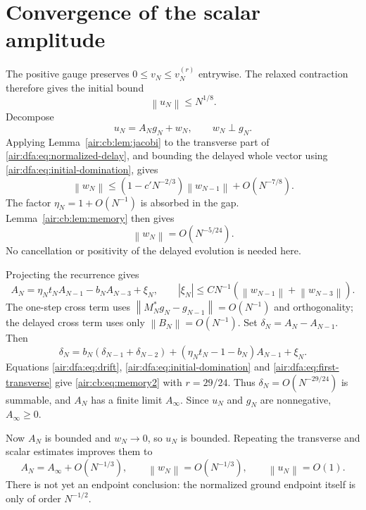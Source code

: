 \documentclass[11pt,letterpaper]{article}
\numberwithin{equation}{section}
\theoremstyle{remark}
\newcommand{\norm}[1]{\left\lVert#1\right\rVert}
\begin{document}
\section{Convergence of the scalar amplitude}

The positive gauge preserves $0\le v_N\le v_N^{(r)}$ entrywise. The relaxed
contraction therefore gives the initial bound
\begin{equation}\label{air:dfa:eq:initial-domination}
\norm{u_N}\le N^{1/8}.
\end{equation}
Decompose
\[
u_N=A_Ng_N+w_N,\qquad w_N\perp g_N.
\]
Applying Lemma~\ref{air:cb:lem:jacobi} to the transverse part of
\eqref{air:dfa:eq:normalized-delay}, and bounding the delayed whole vector using
\eqref{air:dfa:eq:initial-domination}, gives
\[
\norm{w_N}\le(1-c'N^{-2/3})\norm{w_{N-1}}+O(N^{-7/8}).
\]
The factor $\eta_N=1+O(N^{-1})$ is absorbed in the gap. Lemma~\ref{air:cb:lem:memory}
then gives
\begin{equation}\label{air:dfa:eq:first-transverse}
\norm{w_N}=O(N^{-5/24}).
\end{equation}
No cancellation or positivity of the delayed evolution is needed here.

Projecting the recurrence gives
\begin{equation}\label{air:dfa:eq:scalar-recurrence}
A_N=\eta_Nt_NA_{N-1}-b_NA_{N-3}+\xi_N,\qquad
|\xi_N|\le CN^{-1}(\norm{w_{N-1}}+\norm{w_{N-3}}).
\end{equation}
The one-step cross term uses
$\norm{M_N^*g_N-g_{N-1}}=O(N^{-1})$ and orthogonality; the delayed cross
term uses only $\norm{B_N}=O(N^{-1})$. Set $\delta_N=A_N-A_{N-1}$. Then
\begin{equation}\label{air:dfa:eq:scalar-difference}
\delta_N=b_N(\delta_{N-1}+\delta_{N-2})
+(\eta_Nt_N-1-b_N)A_{N-1}+\xi_N.
\end{equation}
Equations \eqref{air:dfa:eq:drift}, \eqref{air:dfa:eq:initial-domination} and
\eqref{air:dfa:eq:first-transverse} give \eqref{air:cb:eq:memory2} with $r=29/24$.
Thus $\delta_N=O(N^{-29/24})$ is summable, and $A_N$ has a finite limit
$A_\infty$. Since $u_N$ and $g_N$ are nonnegative, $A_\infty\ge0$.

Now $A_N$ is bounded and $w_N\to0$, so $u_N$ is bounded. Repeating the
transverse and scalar estimates improves them to
\begin{equation}\label{air:dfa:eq:initial-tracking}
A_N=A_\infty+O(N^{-1/3}),\qquad
\norm{w_N}=O(N^{-1/3}),\qquad \norm{u_N}=O(1).
\end{equation}
There is not yet an endpoint conclusion: the normalized ground endpoint
itself is only of order $N^{-1/2}$.
\end{document}
